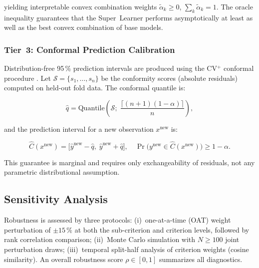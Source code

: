 \documentclass[12pt, a4paper]{article}
\begin{document}
yielding interpretable convex combination weights
$\tilde{\alpha}_k \ge 0$, $\sum_k \tilde{\alpha}_k = 1$.
The oracle inequality guarantees that the Super~Learner performs asymptotically
at least as well as the best convex combination of base models.

\subsubsection{Tier~3: Conformal Prediction Calibration}

Distribution-free 95\,\% prediction intervals are produced using the
CV$^+$ conformal procedure \citep{Barber2023}.  Let
$\mathcal{S} = \{s_1,\ldots,s_n\}$ be the conformity scores (absolute
residuals) computed on held-out fold data.  The conformal quantile is:

\begin{equation}
  \hat{q} = \text{Quantile}\!\left(\mathcal{S};\; \frac{\lceil(n+1)(1-\alpha)\rceil}{n}\right),
  \label{eq:conformal_q}
\end{equation}

and the prediction interval for a new observation $x^{\text{new}}$ is:

\begin{equation}
  \hat{C}(x^{\text{new}}) = \bigl[\hat{y}^{\text{new}} - \hat{q},\;
  \hat{y}^{\text{new}} + \hat{q}\bigr],
  \quad \Pr\bigl(y^{\text{new}} \in \hat{C}(x^{\text{new}})\bigr) \ge 1-\alpha.
  \label{eq:conformal_interval}
\end{equation}

This guarantee is marginal and requires only exchangeability of residuals, not
any parametric distributional assumption.

\subsection{Sensitivity Analysis}

Robustness is assessed by three protocols:
(i)~one-at-a-time (OAT) weight perturbation of $\pm 15\,\%$ at both the
sub-criterion and criterion levels, followed by rank correlation comparison;
(ii)~Monte Carlo simulation with $N \ge 100$ joint perturbation draws;
(iii)~temporal split-half analysis of criterion weights (cosine similarity).
An overall robustness score $\rho \in [0,1]$ summarizes all diagnostics.

\end{document}
